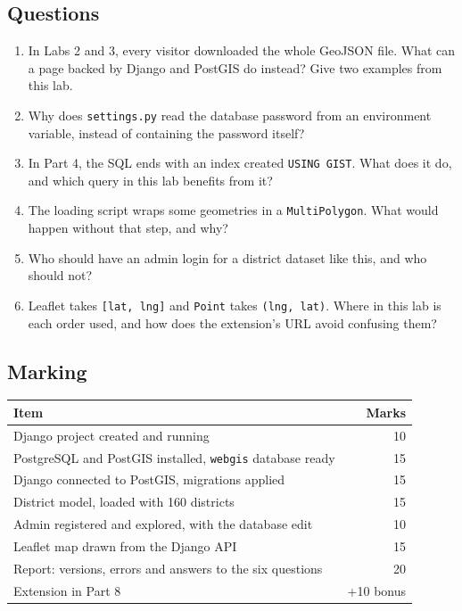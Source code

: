 \documentclass{article}
\newcommand{\cd}[1]{\texttt{#1}}
\begin{document}
\subsection{Questions}

\begin{enumerate}
  \item In Labs 2 and 3, every visitor downloaded the whole GeoJSON file.
        What can a page backed by Django and PostGIS do instead? Give
        two examples from this lab.
  \item Why does \cd{settings.py} read the database password from an
        environment variable, instead of containing the password itself?
  \item In Part 4, the SQL ends with an index created
        \cd{USING GIST}. What does it do, and which query in this lab
        benefits from it?
  \item The loading script wraps some geometries in a
        \cd{MultiPolygon}. What would happen without that step, and why?
  \item Who should have an admin login for a district dataset like this,
        and who should not?
  \item Leaflet takes \cd{[lat, lng]} and \cd{Point} takes
        \cd{(lng, lat)}. Where in this lab is each order used, and how
        does the extension's URL avoid confusing them?
\end{enumerate}

\subsection{Marking}

\begin{tabularx}{\textwidth}{@{}X r@{}}
\toprule
\textbf{Item} & \textbf{Marks} \\
\midrule
Django project created and running                          & 10 \\
PostgreSQL and PostGIS installed, \cd{webgis} database ready & 15 \\
Django connected to PostGIS, migrations applied             & 15 \\
District model, loaded with 160 districts                   & 15 \\
Admin registered and explored, with the database edit       & 10 \\
Leaflet map drawn from the Django API                       & 15 \\
Report: versions, errors and answers to the six questions   & 20 \\
\midrule
Extension in Part 8                                         & +10 bonus \\
\bottomrule
\end{tabularx}
\end{document}
